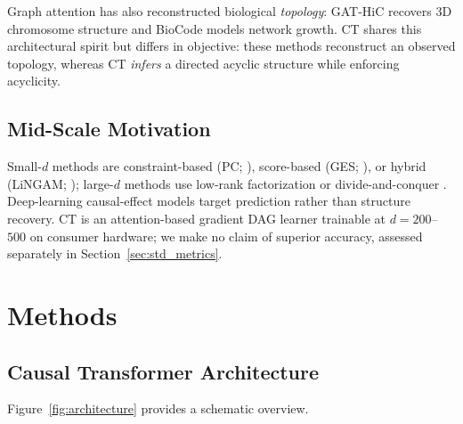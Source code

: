 \documentclass[12pt,a4paper]{article}
\begin{document}
Graph attention has also reconstructed biological \emph{topology}: GAT-HiC \cite{kaya2026gathic} recovers 3D chromosome structure and BioCode \cite{sefer2022biocode} models network growth. CT shares this architectural spirit but differs in objective: these methods reconstruct an observed topology, whereas CT \emph{infers} a directed acyclic structure while enforcing acyclicity.

\subsection{Mid-Scale Motivation}

Small-$d$ methods are constraint-based (PC; \cite{spirtes2000causation}), score-based (GES; \cite{chickering2002optimal}), or hybrid (LiNGAM; \cite{shimizu2006lingam}); large-$d$ methods use low-rank factorization \cite{chen2023lowrank} or divide-and-conquer \cite{gu2022large}. Deep-learning causal-effect models \cite{makala2026causal} target prediction rather than structure recovery. CT is an attention-based gradient DAG learner trainable at $d=200$--$500$ on consumer hardware; we make no claim of superior accuracy, assessed separately in Section~\ref{sec:std_metrics}.

\section{Methods}

\subsection{Causal Transformer Architecture}

Figure~\ref{fig:architecture} provides a schematic overview.

\end{document}
